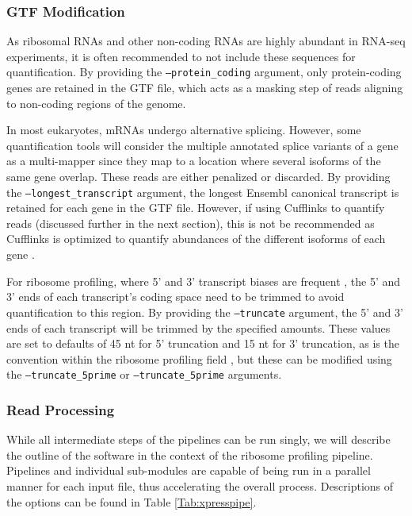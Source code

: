 \documentclass[11pt, a4paper, oneside]{article}
\begin{document}
\subsubsection{GTF Modification}
As ribosomal RNAs and other non-coding RNAs are highly abundant in RNA-seq experiments, it is often recommended to not include these sequences for quantification. By providing the \texttt{--protein\_coding} argument, only protein-coding genes are retained in the GTF file, which acts as a masking step of reads aligning to non-coding regions of the genome. \par

In most eukaryotes, mRNAs undergo alternative splicing. However, some quantification tools will consider the multiple annotated splice variants of a gene as a multi-mapper since they map to a location where several isoforms of the same gene overlap. These reads are either penalized or discarded. By providing the \texttt{--longest\_transcript} argument, the longest Ensembl canonical transcript \cite{ensembl_canon} is retained for each gene in the GTF file. However, if using Cufflinks to quantify reads (discussed further in the next section), this is not be recommended as Cufflinks is optimized to quantify abundances of the different isoforms of each gene \cite{cufflinks}. \par

For ribosome profiling, where 5' and 3' transcript biases are frequent \cite{ingolia_meth, weinberg_reports}, the 5' and 3' ends of each transcript's coding space need to be trimmed to avoid quantification to this region. By providing the \texttt{--truncate} argument, the 5' and 3' ends of each transcript will be trimmed by the specified amounts. These values are set to defaults of 45 nt for 5' truncation and 15 nt for 3' truncation, as is the convention within the ribosome profiling field \cite{ingolia_meth}, but these can be modified using the \texttt{--truncate\_5prime} or \texttt{--truncate\_5prime} arguments.

\subsubsection{Read Processing}
While all intermediate steps of the pipelines can be run singly, we will describe the outline of the software in the context of the ribosome profiling pipeline. Pipelines and individual sub-modules are capable of being run in a parallel manner for each input file, thus accelerating the overall process. Descriptions of the options can be found in Table \ref{Tab:xpresspipe}.
\end{document}
